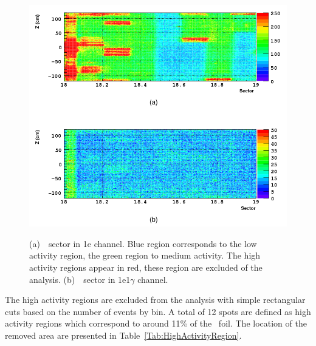 \documentclass[main.tex]{subfiles}
\begin{document}
\begin{figure}[h!]
\centering
\includegraphics[scale=0.45]{pictures/Chap6/CdSector-1e-1e1g.png}
\label{CdSector1eChannel}
\caption{(a)~\Cd~sector in 1e channel. Blue region corresponds to the low activity region, the green region to medium activity. The high activity regions appear in red, these region are excluded of the analysis. (b)~\Cd~sector in 1e1$\gamma$ channel.}
\end{figure}


\bigskip


\NI The high activity regions are excluded from the analysis with simple rectangular cuts based on the number of events by bin. A total of 12 spots are defined as high activity regions which correspond to around 11\% of the \Cd~foil. The location of the removed area are presented in Table~\ref{Tab:HighActivityRegion}. 
\end{document}
